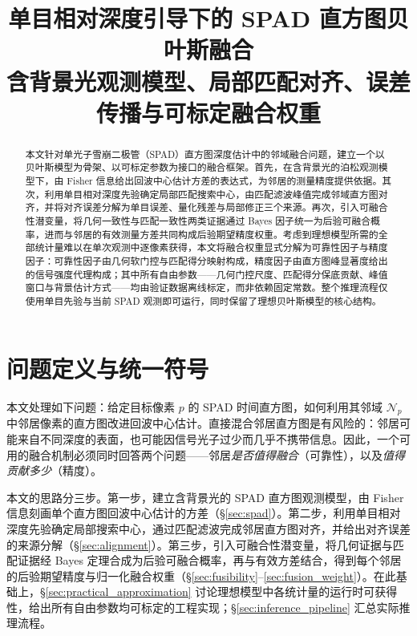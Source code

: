 \documentclass[11pt,a4paper]{ctexart}
\title{\textbf{单目相对深度引导下的 SPAD 直方图贝叶斯融合}\\
含背景光观测模型、局部匹配对齐、误差传播与可标定融合权重}
\author{}
\date{}
\numberwithin{equation}{section}
\begin{document}
\maketitle

\begin{abstract}
本文针对单光子雪崩二极管（SPAD）直方图深度估计中的邻域融合问题，建立一个以贝叶斯模型为骨架、以可标定参数为接口的融合框架。首先，在含背景光的泊松观测模型下，由 Fisher 信息给出回波中心估计方差的表达式，为邻居的测量精度提供依据。其次，利用单目相对深度先验确定局部匹配搜索中心，由匹配滤波峰值完成邻域直方图对齐，并将对齐误差分解为单目误差、量化残差与局部修正三个来源。再次，引入可融合性潜变量，将几何一致性与匹配一致性两类证据通过 Bayes 因子统一为后验可融合概率，进而与邻居的有效测量方差共同构成后验期望精度权重。考虑到理想模型所需的全部统计量难以在单次观测中逐像素获得，本文将融合权重显式分解为可靠性因子与精度因子：可靠性因子由几何软门控与匹配得分映射构成，精度因子由直方图峰显著度给出的信号强度代理构成；其中所有自由参数——几何门控尺度、匹配得分保底贡献、峰值窗口与背景估计方式——均由验证数据离线标定，而非依赖固定常数。整个推理流程仅使用单目先验与当前 SPAD 观测即可运行，同时保留了理想贝叶斯模型的核心结构。
\end{abstract}

\tableofcontents
\newpage

\section{问题定义与统一符号}
\label{sec:problem}

本文处理如下问题：给定目标像素 $p$ 的 SPAD 时间直方图，如何利用其邻域 $\mathcal N_p$ 中邻居像素的直方图改进回波中心估计。直接混合邻居直方图是有风险的：邻居可能来自不同深度的表面，也可能因信号光子过少而几乎不携带信息。因此，一个可用的融合机制必须同时回答两个问题——邻居\emph{是否值得融合}（可靠性），以及\emph{值得贡献多少}（精度）。

本文的思路分三步。第一步，建立含背景光的 SPAD 直方图观测模型，由 Fisher 信息刻画单个直方图回波中心估计的方差（\S\ref{sec:spad}）。第二步，利用单目相对深度先验确定局部搜索中心，通过匹配滤波完成邻居直方图对齐，并给出对齐误差的来源分解（\S\ref{sec:alignment}）。第三步，引入可融合性潜变量，将几何证据与匹配证据经 Bayes 定理合成为后验可融合概率，再与有效方差结合，得到每个邻居的后验期望精度与归一化融合权重（\S\ref{sec:fusibility}--\ref{sec:fusion_weight}）。在此基础上，\S\ref{sec:practical_approximation} 讨论理想模型中各统计量的运行时可获得性，给出所有自由参数均可标定的工程实现；\S\ref{sec:inference_pipeline} 汇总实际推理流程。
\end{document}
